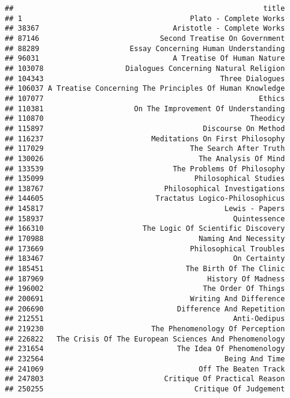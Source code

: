 \documentclass[
]{article}
\begin{document}
\begin{verbatim}
##                                                          title
## 1                                       Plato - Complete Works
## 38367                               Aristotle - Complete Works
## 87146                            Second Treatise On Government
## 88289                     Essay Concerning Human Understanding
## 96031                               A Treatise Of Human Nature
## 103078                   Dialogues Concerning Natural Religion
## 104343                                         Three Dialogues
## 106037 A Treatise Concerning The Principles Of Human Knowledge
## 107077                                                  Ethics
## 110381                     On The Improvement Of Understanding
## 110870                                                Theodicy
## 115897                                     Discourse On Method
## 116237                         Meditations On First Philosophy
## 117029                                  The Search After Truth
## 130026                                    The Analysis Of Mind
## 133539                              The Problems Of Philosophy
## 135099                                   Philosophical Studies
## 138767                            Philosophical Investigations
## 144605                          Tractatus Logico-Philosophicus
## 145817                                          Lewis - Papers
## 158937                                            Quintessence
## 166310                       The Logic Of Scientific Discovery
## 170988                                    Naming And Necessity
## 173669                                  Philosophical Troubles
## 183467                                            On Certainty
## 185451                                 The Birth Of The Clinic
## 187969                                      History Of Madness
## 196002                                     The Order Of Things
## 200691                                  Writing And Difference
## 206690                               Difference And Repetition
## 212551                                            Anti-Oedipus
## 219230                         The Phenomenology Of Perception
## 226822   The Crisis Of The European Sciences And Phenomenology
## 231654                               The Idea Of Phenomenology
## 232564                                          Being And Time
## 241069                                    Off The Beaten Track
## 247803                            Critique Of Practical Reason
## 250255                                   Critique Of Judgement

\end{verbatim}
\end{document}
